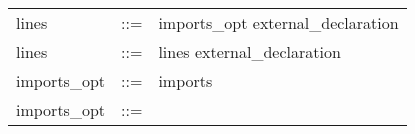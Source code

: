 \documentclass[11pt]{article}
\begin{document}
\begin{longtable}{lrl}
lines                                      & ::= &
  \begin{minipage}[t]{\rulerhs}
    \raggedright
    imports\_opt external\_declaration
  \end{minipage}                                                             \\
lines                                      & ::= &
  \begin{minipage}[t]{\rulerhs}
    \raggedright
    lines external\_declaration
  \end{minipage}                                                             \\
imports\_opt                               & ::= &
  \begin{minipage}[t]{\rulerhs}
    \raggedright
    imports
  \end{minipage}                                                             \\
imports\_opt                               & ::= &
  \begin{minipage}[t]{\rulerhs}
    \raggedright
    

\end{minipage}
\end{longtable}
\end{document}

